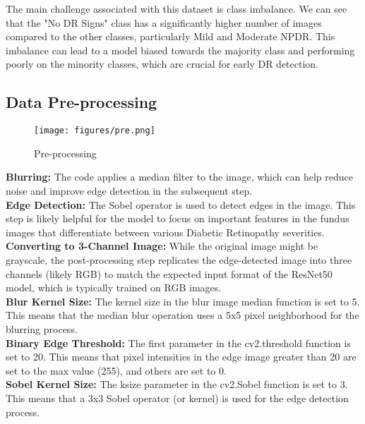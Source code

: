 \documentclass[conference]{IEEEtran}
\begin{document}
The main challenge associated with this dataset is class imbalance. We can see that the "No DR Signs" class has a significantly higher number of images compared to the other classes, particularly Mild and Moderate NPDR. This imbalance can lead to a model biased towards the majority class and performing poorly on the minority classes, which are crucial for early DR detection.\\

\subsection{Data Pre-processing}

\begin{figure}[h]
\centering
\texttt{[image: figures/pre.png]}
\caption{Pre-processing}
\label{fig:preprocess}
\end{figure}

\textbf{Blurring:} The code applies a median filter to the image, which can help reduce noise and improve edge detection in the subsequent step.\\

\textbf{Edge Detection:} The Sobel operator is used to detect edges in the image. This step is likely helpful for the model to focus on important features in the fundus images that differentiate between various Diabetic Retinopathy severities.\\

\textbf{Converting to 3-Channel Image:} While the original image might be grayscale, the post-processing step replicates the edge-detected image into three channels (likely RGB) to match the expected input format of the ResNet50 model, which is typically trained on RGB images.\\

\textbf{Blur Kernel Size:} The kernel size in the blur image median function is set to 5. This means that the median blur operation uses a 5x5 pixel neighborhood for the blurring process.\\

\textbf{Binary Edge Threshold:} The first parameter in the cv2.threshold function is set to 20. This means that pixel intensities in the edge image greater than 20 are set to the max value (255), and others are set to 0.\\

\textbf{Sobel Kernel Size:} The ksize parameter in the cv2.Sobel function is set to 3. This means that a 3x3 Sobel operator (or kernel) is used for the edge detection process.\\
\end{document}
